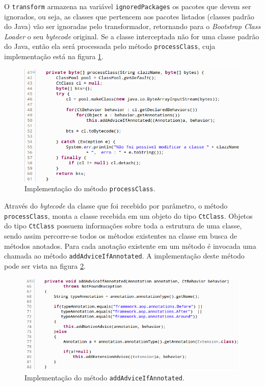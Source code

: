 \documentclass[tc,oneside]{iiufrgs}
\begin{document}
O \texttt{transform} armazena na variável \texttt{ignoredPackages} os pacotes que devem ser ignorados, ou seja, as classes que pertencem aos pacotes listados (classes padrão do Java) vão ser ignoradas pelo transformador, retornando para o \textit{Bootstrap Class Loader} o seu \textit{bytecode} original. Se a classe interceptada não for uma classe padrão do Java, então ela será processada pelo método \texttt{processClass}, cuja implementação está na figura \ref{fig:processClass}.

\begin{figure}[ht]
	\centering
	\includegraphics[scale=0.5]{figuras/implementacao/processClass.png}
	\caption{Implementação do método \texttt{processClass}.}
	\label{fig:processClass}
\end{figure}

Através do \textit{bytecode} da classe que foi recebido por parâmetro, o método \texttt{processClass}, monta a classe recebida em um objeto do tipo \texttt{CtClass}. Objetos do tipo \texttt{CtClass} possuem informações sobre toda a estrutura de uma classe, sendo assim percorre-se todos os métodos existentes na classe  em busca de métodos anotados. Para cada anotação existente em um método é invocada uma chamada ao método \texttt{addAdviceIfAnnotated}. A implementação deste método pode ser vista na figura \ref{fig:addadviceifannotated}.

\begin{figure}[ht]
	\centering
	\includegraphics[scale=0.6]{figuras/implementacao/addadviceifannotated.png}
	\caption{Implementação do método \texttt{addAdviceIfAnnotated}.}
	\label{fig:addadviceifannotated}
\end{figure}
\end{document}
